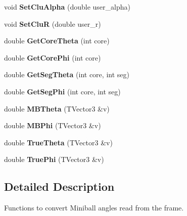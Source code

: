 \begin{DoxyCompactItemize}
\item 
\mbox{\label{class_m_b_geometry_a0d4868b0360a6e5534918a9813540015}} 
void {\bfseries Set\+Clu\+Alpha} (double user\+\_\+alpha)
\item 
\mbox{\label{class_m_b_geometry_a292c4326421c78871667e91c3694ae35}} 
void {\bfseries Set\+CluR} (double user\+\_\+r)
\item 
\mbox{\label{class_m_b_geometry_a42aa536f15017724812712b0f8a77c12}} 
double {\bfseries Get\+Core\+Theta} (int core)
\item 
\mbox{\label{class_m_b_geometry_a39f685610ae0e68e547a46f8ef992599}} 
double {\bfseries Get\+Core\+Phi} (int core)
\item 
\mbox{\label{class_m_b_geometry_a49cdf742a2902fc85f0b24dfffa554a8}} 
double {\bfseries Get\+Seg\+Theta} (int core, int seg)
\item 
\mbox{\label{class_m_b_geometry_a575ddd6022d2d686a83ebce3195b6c50}} 
double {\bfseries Get\+Seg\+Phi} (int core, int seg)
\item 
\mbox{\label{class_m_b_geometry_af4adfb858000405b21f79a6bf10c3c37}} 
double {\bfseries M\+B\+Theta} (T\+Vector3 \&v)
\item 
\mbox{\label{class_m_b_geometry_a399568d67bb83801ef6a2dbe963a535e}} 
double {\bfseries M\+B\+Phi} (T\+Vector3 \&v)
\item 
\mbox{\label{class_m_b_geometry_afd393f9db7182de7fb19f0c934edb383}} 
double {\bfseries True\+Theta} (T\+Vector3 \&v)
\item 
\mbox{\label{class_m_b_geometry_a718d9c7fcc4a5fb8b9ecaabdc7a0503f}} 
double {\bfseries True\+Phi} (T\+Vector3 \&v)
\end{DoxyCompactItemize}


\subsection{Detailed Description}
Functions to convert Miniball angles read from the frame. 



